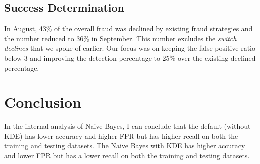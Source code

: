 \documentclass[conference]{IEEEtran}
\begin{document}
%



\subsection{Success Determination}

In August, 43\% of the overall fraud was declined by existing fraud strategies and the number reduced to 36\% in September.  This number excludes the \textit{switch declines} that we spoke of earlier.  Our focus was on keeping the false positive ratio below 3 and improving the detection percentage to 25\% over the existing declined percentage.

\section{Conclusion}

In the internal analysis of Naive Bayes, I can conclude that the default (without KDE) has lower accuracy and higher FPR but has higher recall on both the training and testing datasets. The Naive Bayes with KDE has higher accuracy and lower FPR but has a lower recall on both the training and testing datasets.
\end{document}
